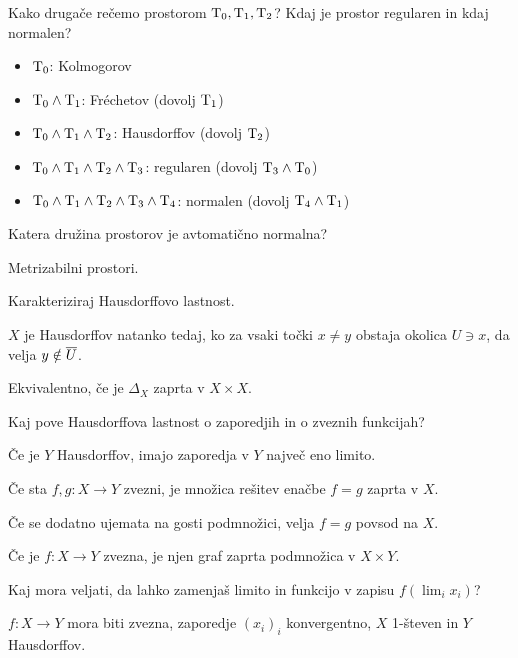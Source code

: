 \begin{vo}{Kako drugače rečemo prostorom $\text{T}_{0}, \text{T}_{1}, \text{T}_{2}$?
Kdaj je prostor regularen in kdaj normalen?}

\begin{itemize}
  \item $\text{T}_{0}$: Kolmogorov
  \item $\text{T}_{0} \land \text{T}_{1}$: Fréchetov (dovolj $\text{T}_{1}$)
  \item $\text{T}_{0} \land \text{T}_{1} \land \text{T}_{2}$: Hausdorffov (dovolj $\text{T}_{2}$)
  \item $\text{T}_{0} \land \text{T}_{1} \land \text{T}_{2} \land \text{T}_{3}$:
    regularen (dovolj $\text{T}_{3} \land \text{T}_{0}$)
  \item $\text{T}_{0} \land \text{T}_{1} \land \text{T}_{2} \land \text{T}_{3} \land \text{T}_{4}$:
    normalen (dovolj $\text{T}_{4} \land \text{T}_{1}$)
\end{itemize}

\end{vo}

\begin{vo}{Katera družina prostorov je avtomatično normalna?}

Metrizabilni prostori.

\end{vo}

\begin{vo}{Karakteriziraj Hausdorffovo lastnost.}

$X$ je Hausdorffov natanko tedaj, ko za vsaki točki $x \ne y$ obstaja okolica
$U \ni x$, da velja $y \notin \overline{U}$.

Ekvivalentno, če je $\Delta_X$ zaprta v $X \times X$.

\end{vo}

\begin{vo}{Kaj pove Hausdorffova lastnost o zaporedjih in o zveznih funkcijah?}

Če je $Y$ Hausdorffov, imajo zaporedja v $Y$ največ eno limito.

Če sta $f, g: X \to Y$ zvezni, je množica rešitev enačbe $f = g$ zaprta v $X$.

Če se dodatno ujemata na gosti podmnožici, velja $f = g$ povsod na $X$.

Če je $f: X \to Y$ zvezna, je njen graf zaprta podmnožica v $X \times Y$.

\end{vo}

\begin{vo}{Kaj mora veljati, da lahko zamenjaš limito in funkcijo v zapisu
$f(\lim_i x_i)$?}

$f: X \to Y$ mora biti zvezna, zaporedje $(x_i)_i$ konvergentno, $X$ 1-števen
in $Y$ Hausdorffov.

\end{vo}


